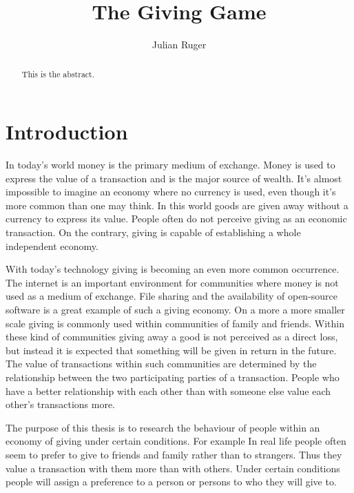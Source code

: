 \documentclass[twoside,openright]{uva-bachelor-thesis}
\title{The Giving Game}
\author{Julian Ruger}
\begin{document}
\maketitle

\begin{abstract}
This is the abstract. 
\end{abstract}

\tableofcontents

\chapter{Introduction}
In today's world money is the primary medium of exchange. Money is used to express the value of a transaction and is the major source of wealth. It's almost impossible to imagine an economy where no currency is used, even though it's more common than one may think. In this world goods are given away without a currency to express its value. People often do not perceive giving as an economic transaction. On the contrary, giving is capable of establishing a whole independent economy. 

With today’s technology giving is becoming an even more common occurrence. The internet is an important environment for communities where money is not used as a medium of exchange. File sharing and the availability of open-source software is a great example of such a giving economy. On a more a more smaller scale giving is commonly used within communities of family and friends. Within these kind of communities giving away a good is not perceived as a direct loss, but instead it is expected that something will be given in return in the future. The value of transactions within such communities are determined by the relationship between the two participating parties of a transaction. People who have a better relationship with each other than with someone else value each other’s transactions more. 

The purpose of this thesis is to research the behaviour of people within an economy of giving under certain conditions. For example In real life people often seem to prefer to give to friends and family rather than to strangers. Thus they value a transaction with them more than with others. Under certain conditions people will assign a preference to a person or persons to who they will give to. 
\end{document}
